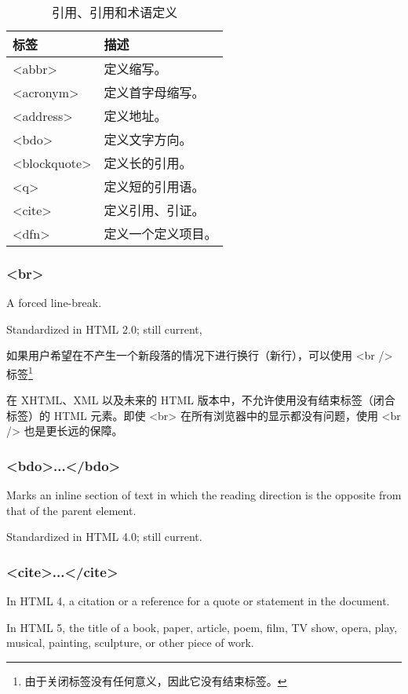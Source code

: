 \begin{table}[!h]
\centering
\caption{引用、引用和术语定义}
\begin{tabular}{|l|l|}
\hline
标签		&描述			\\
\hline
<abbr>	&定义缩写。		\\
\hline
<acronym>&定义首字母缩写。\\
\hline
<address>&定义地址。		\\
\hline
<bdo>	&定义文字方向。	\\
\hline
<blockquote>&定义长的引用。\\
\hline
<q>		&定义短的引用语。\\
\hline
<cite>	&定义引用、引证。\\
\hline
<dfn>	&定义一个定义项目。\\
\hline
\end{tabular}
\end{table}

\subsubsection{<br>}

A forced line-break.

Standardized in HTML 2.0; still current,

如果用户希望在不产生一个新段落的情况下进行换行（新行），可以使用 <br /> 标签\footnote{由于关闭标签没有任何意义，因此它没有结束标签。}

在 XHTML、XML 以及未来的 HTML 版本中，不允许使用没有结束标签（闭合标签）的 HTML 元素。即使 <br> 在所有浏览器中的显示都没有问题，使用 <br /> 也是更长远的保障。



\subsubsection{<bdo>...</bdo>}

Marks an inline section of text in which the reading direction is the opposite from that of the parent element.

Standardized in HTML 4.0; still current.


\subsubsection{<cite>...</cite>}

In HTML 4, a citation or a reference for a quote or statement in the document.

In HTML 5, the title of a book, paper, article, poem, film, TV show, opera, play, musical, painting, sculpture, or other piece of work.

